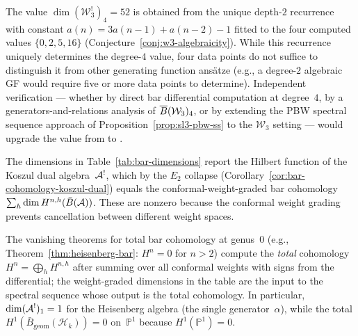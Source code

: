 \begin{remark}[Status of \texorpdfstring{$H^4(\mathcal{W}_3) = 52$}{H4(W3) = 52}]
\label{rem:w3-h4-status}
The value $\dim(\mathcal{W}_3^!)_4 = 52$ is obtained from the unique
depth-$2$ recurrence with constant $a(n) = 3a(n{-}1) + a(n{-}2) - 1$
fitted to the four computed values $\{0, 2, 5, 16\}$
(Conjecture~\ref{conj:w3-algebraicity}).  While this recurrence uniquely
determines the degree-$4$ value, four data points do not suffice to
distinguish it from other generating function ansätze (e.g., a degree-$2$
algebraic GF would require five or more data points to determine).
Independent verification --- whether by direct bar differential computation
at degree~$4$, by a generators-and-relations analysis of
$\overline{B}(\mathcal{W}_3)_4$, or by extending the PBW spectral sequence
approach of Proposition~\ref{prop:sl3-pbw-ss} to the $\mathcal{W}_3$
setting --- would upgrade the value from \ClaimStatusConjectured{} to
\ClaimStatusProvedHere{}.
\end{remark}

\begin{remark}\label{rem:table-vs-vanishing}
The dimensions in Table~\ref{tab:bar-dimensions} report the
Hilbert function of the Koszul dual algebra~$\mathcal{A}^!$, which by the
$E_2$ collapse (Corollary~\ref{cor:bar-cohomology-koszul-dual})
equals the conformal-weight-graded bar cohomology
$\sum_h \dim H^{n,h}(\bar{B}(\mathcal{A}))$.
These are nonzero because the conformal weight grading
prevents cancellation between different weight spaces.

The vanishing theorems for total bar cohomology at genus~$0$
(e.g., Theorem~\ref{thm:heisenberg-bar}: $H^n = 0$ for $n > 2$)
compute the \emph{total} cohomology $H^n = \bigoplus_h H^{n,h}$
after summing over all conformal weights with signs from the
differential; the weight-graded dimensions in the table are the
input to the spectral sequence whose output is the total
cohomology.  In particular, $\dim (\mathcal{A}^!)_1 = 1$ for the
Heisenberg algebra (the single generator~$\alpha$), while the
total $H^1(\bar{B}_{\mathrm{geom}}(\mathcal{H}_k)) = 0$
on~$\mathbb{P}^1$ because $H^1(\mathbb{P}^1) = 0$.
\end{remark}


